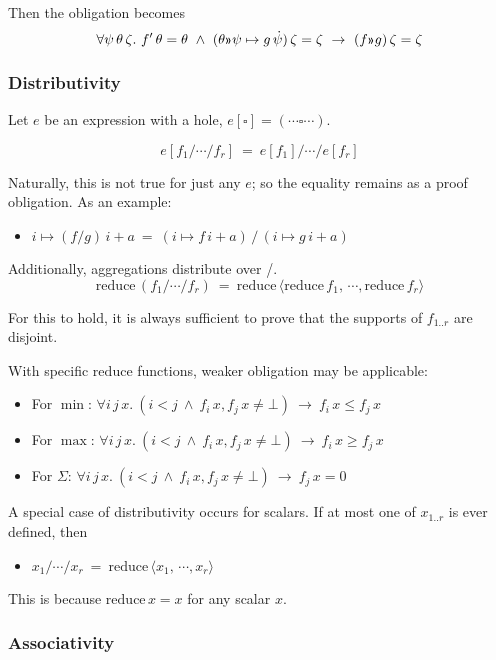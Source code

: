 \documentclass{article}
\newcommand\limplies{\rightarrow}
\begin{document}
Then the obligation becomes
%
\[\forall \psi\,\theta\,\zeta.~ f'\,\theta=\theta ~\land~ (\theta \applt \psi\mapsto g\,\dot\psi)\,\zeta=\zeta ~\limplies~
          (f\applt g)\,\zeta = \zeta\]

\subsubsection{Distributivity}

Let $e$ be an expression with a hole, $e[\square] = (\cdots \square \cdots)$.

\[e[f_1/\cdots/f_r] ~=~ e[f_1] / \cdots / e[f_r]\]

Naturally, this is not true for just any $e$; so the equality remains as a proof obligation.
As an example:
\begin{itemize}
  \item  $i \mapsto (f/g)\,i + a ~=~ (i \mapsto f\,i + a) \,\big/\, (i \mapsto g\,i + a)$
\end{itemize}

\bigskip\noindent
Additionally, aggregations distribute over /.
\[\mathrm{reduce}\,(f_1/\cdots/f_r) ~=~ \mathrm{reduce}\,\langle\mathrm{reduce}\,f_1, \,\cdots, \mathrm{reduce}\,f_r\rangle\]

For this to hold, it is always sufficient to prove that the supports of $f_{1 .. r}$ are disjoint.

With specific $\mathrm{reduce}$ functions, weaker obligation may be applicable:
\begin{itemize}
  \item For $\min$: $\forall i\,j\,x.~ (i<j ~\land~ f_i\,x, f_j\,x\neq\bot) ~\limplies~
    f_i\,x\leq f_j\,x$
  \item For $\max$: $\forall i\,j\,x.~ (i<j ~\land~ f_i\,x, f_j\,x\neq\bot) ~\limplies~
    f_i\,x\geq f_j\,x$
  \item For $\Sigma$: $\forall i\,j\,x.~ (i<j ~\land~ f_i\,x, f_j\,x\neq\bot) ~\limplies~
    f_j\,x = 0$
\end{itemize}

A special case of distributivity occurs for scalars. If at most one of $x_{1..r}$
is ever defined, then
\begin{itemize}
  \item $x_1 / \cdots / x_r ~=~ \mathrm{reduce}\,\langle x_1, \,\cdots, x_r\rangle$
\end{itemize}

This is because $\mathrm{reduce}\,x = x$ for any scalar $x$.


\subsubsection{Associativity}
\end{document}
